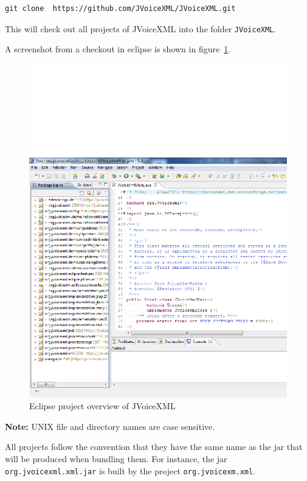\documentclass[11pt,a4paper]{article}
\begin{document}
\begin{lstlisting}
git clone  https://github.com/JVoiceXML/JVoiceXML.git
\end{lstlisting}

This will check out all projects of JVoiceXML
into the folder \texttt{JVoiceXML}. 

A screenshot from a checkout in eclipse is shown in
figure~\ref{fig:eclipse-projects}.
\begin{figure}
\includegraphics[width=\linewidth]{eclipse-projects.png}
\caption{Eclipse project overview of JVoiceXML}
\label{fig:eclipse-projects}
\end{figure}

\textbf{Note:} UNIX file and directory names are case sensitive.

All projects follow the convention that they have the same name as the jar
that will be produced when bundling them. For instance, the jar \lstinline{org.jvoicexml.xml.jar}
is built by the project \lstinline{org.jvoicexm.xml}.
\end{document}
